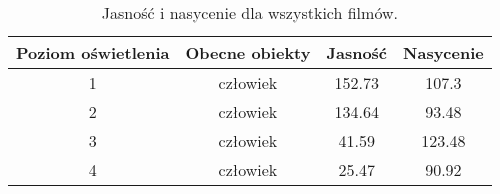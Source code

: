 \begin{table}[H]
\centering
\caption{Jasność i nasycenie dla wszystkich filmów.}
\begin{tabular}{|c|c|c|c|}
\hline
Poziom oświetlenia  & Obecne obiekty & Jasność & Nasycenie \\ \hline
1        & człowiek       & 152.73  & 107.3     \\ \hline
2        & człowiek       & 134.64  & 93.48     \\ \hline
3        & człowiek       & 41.59   & 123.48    \\ \hline
4        & człowiek       & 25.47   & 90.92     \\ \hline
\end{tabular}

\label{tab:saturacja-jasnosc-czlowiek}
\end{table}